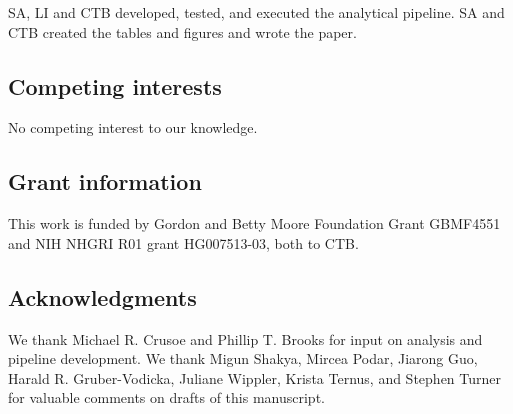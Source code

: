 \documentclass[11pt]{article}
\begin{document}
SA, LI and CTB developed, tested, and executed the analytical pipeline.
SA and CTB created the tables and figures and wrote the paper.

\subsection*{Competing interests}
No competing interest to our knowledge.

\subsection*{Grant information}
This work is funded by
Gordon and Betty Moore Foundation Grant GBMF4551 and
NIH NHGRI R01 grant HG007513-03, both to CTB.

\subsection*{Acknowledgments}
We thank Michael R. Crusoe and Phillip T. Brooks for input on analysis
and pipeline development.  We thank Migun Shakya, Mircea Podar, Jiarong Guo,
Harald R. Gruber-Vodicka, Juliane Wippler, Krista Ternus, and Stephen
Turner for valuable comments on drafts of this manuscript.

{\small }

\bigskip








\end{document}
